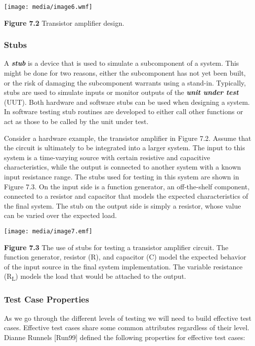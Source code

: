 \texttt{[image: media/image6.wmf]}

\textbf{Figure 7.2} Transistor amplifier design.

\subsubsection{Stubs}\label{stubs}

A \emph{\textbf{stub}} is a device that is used to simulate a
subcomponent of a system. This might be done for two reasons, either the
subcomponent has not yet been built, or the risk of damaging the
subcomponent warrants using a stand-in. Typically, stubs are used to
simulate inputs or monitor outputs of the \emph{\textbf{unit under
test}} (UUT). Both hardware and software stubs can be used when
designing a system. In software testing stub routines are developed to
either call other functions or act as those to be called by the unit
under test.

Consider a hardware example, the transistor amplifier in Figure 7.2.
Assume that the circuit is ultimately to be integrated into a larger
system. The input to this system is a time-varying source with certain
resistive and capacitive characteristics, while the output is connected
to another system with a known input resistance range. The stubs used
for testing in this system are shown in Figure 7.3. On the input side is
a function generator, an off-the-shelf component, connected to a
resistor and capacitor that models the expected characteristics of the
final system. The stub on the output side is simply a resistor, whose
value can be varied over the expected load.

\texttt{[image: media/image7.emf]}

\textbf{Figure 7.3} The use of stubs for testing a transistor amplifier
circuit. The function generator, resistor (R), and capacitor (C) model
the expected behavior of the input source in the final system
implementation. The variable resistance (R\textsubscript{L}) models the
load that would be attached to the output.

\subsubsection{Test Case Properties}\label{test-case-properties}

As we go through the different levels of testing we will need to build
effective test cases. Effective test cases share some common attributes
regardless of their level. Dianne Runnels {[}Run99{]} defined the
following properties for effective test cases:

